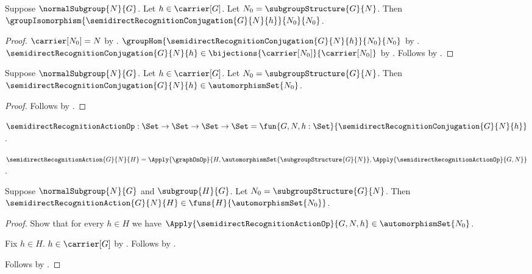\begin{theorem}\label{semidirect_recognition_conjugation_isomorphism}
    Suppose $\normalSubgroup{N}{G}$.
    Let $h\in\carrier[G]$.
    Let $N_0=\subgroupStructure{G}{N}$.
    Then
        $\groupIsomorphism
            {\semidirectRecognitionConjugation{G}{N}{h}}{N_0}{N_0}$.
\end{theorem}
\begin{proof}
    $\carrier[N_0]=N$ by .
    $\groupHom{\semidirectRecognitionConjugation{G}{N}{h}}
        {N_0}{N_0}$ by
        .
    $\semidirectRecognitionConjugation{G}{N}{h}\in
        \bijections{\carrier[N_0]}{\carrier[N_0]}$ by
        .
    Follows by .
\end{proof}

\begin{proposition}\label{semidirect_recognition_conjugation_automorphism}
    Suppose $\normalSubgroup{N}{G}$.
    Let $h\in\carrier[G]$.
    Let $N_0=\subgroupStructure{G}{N}$.
    Then
        $\semidirectRecognitionConjugation{G}{N}{h}\in
            \automorphismSet{N_0}$.
\end{proposition}
\begin{proof}
    Follows by
        .
\end{proof}

\begin{definition}\label{semidirect_recognition_action_op}
    $\semidirectRecognitionActionOp:\Set\to\Set\to\Set\to\Set
        =\fun{G,N,h:\Set}{
            \semidirectRecognitionConjugation{G}{N}{h}}$.
\end{definition}

\begin{definition}\label{semidirect_recognition_action}
    $\semidirectRecognitionAction{G}{N}{H}=
        \Apply{\graphOnOp}
            {H,\automorphismSet{\subgroupStructure{G}{N}},
             \Apply{\semidirectRecognitionActionOp}{G,N}}$.
\end{definition}

\begin{proposition}\label{semidirect_recognition_action_type}
    Suppose $\normalSubgroup{N}{G}$ and $\subgroup{H}{G}$.
    Let $N_0=\subgroupStructure{G}{N}$.
    Then $\semidirectRecognitionAction{G}{N}{H}\in
        \funs{H}{\automorphismSet{N_0}}$.
\end{proposition}
\begin{proof}
    Show that for every $h\in H$ we have
        $\Apply{\semidirectRecognitionActionOp}{G,N,h}\in
            \automorphismSet{N_0}$.
    \begin{subproof}
        Fix $h\in H$.
        $h\in\carrier[G]$ by .
        Follows by
            .
    \end{subproof}
    Follows by
        .
\end{proof}

